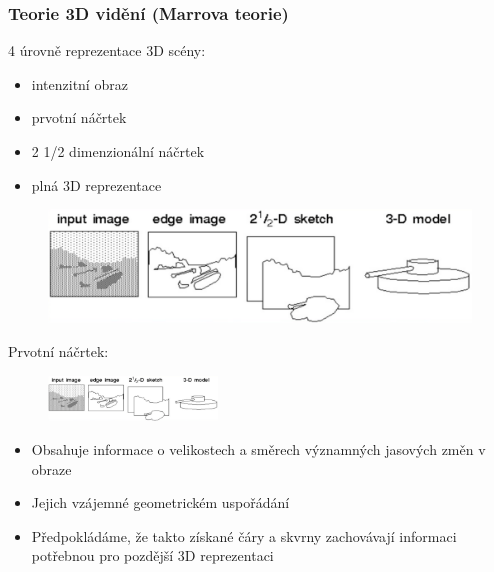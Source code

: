 \begin{frame}
\frametitle{Teorie 3D vidění (Marrova teorie)}
4 úrovně reprezentace 3D scény:
\begin{itemize}
	\item intenzitní obraz
	\item prvotní  náčrtek
	\item 2 1/2 dimenzionální náčrtek
    \item plná 3D reprezentace	
\end{itemize}
	\begin{figure}[!ht]
	\centering
	\includegraphics[width = 1.0\textwidth]{./tank}
	\end{figure}
\end{frame}

\begin{frame}
Prvotní náčrtek:
	\begin{figure}[!ht]
	\centering
	\includegraphics[trim=250 0 650 70,clip, width = 0.4\textwidth]{./tank}
	\end{figure}
\begin{itemize}
	\item Obsahuje informace o velikostech a směrech významných jasových změn v obraze 
	\item Jejich  vzájemné  geometrickém  uspořádání
	\item Předpokládáme,  že  takto  získané  čáry  a  skvrny zachovávají informaci potřebnou pro pozdější 3D reprezentaci
\end{itemize}
\end{frame}

